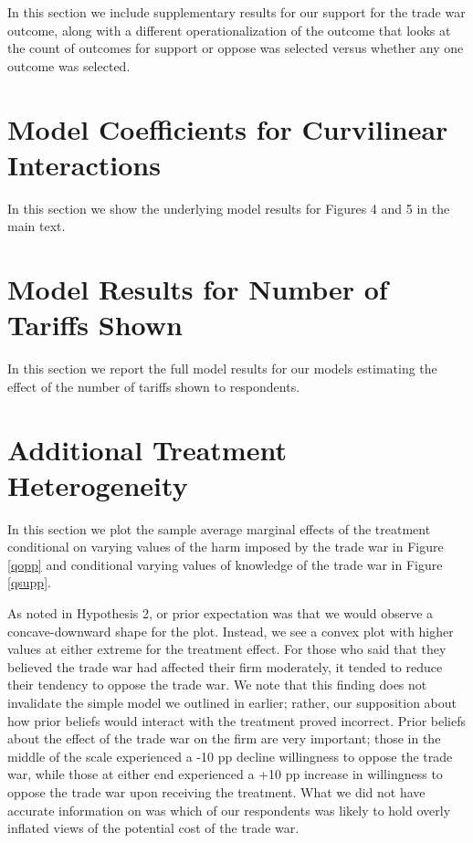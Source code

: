 In this section we include supplementary results for our support for the trade war outcome, along with a different operationalization of the outcome that looks at the count of outcomes for support or oppose was selected versus whether any one outcome was selected.





\section{Model Coefficients for Curvilinear Interactions}

In this section we show the underlying model results for Figures 4 and 5 in the main text.



\section{Model Results for Number of Tariffs Shown}

In this section we report the full model results for our models estimating the effect of the number of tariffs shown to respondents.




\section{Additional Treatment Heterogeneity}

In this section we plot the sample average marginal effects of the treatment conditional on varying values of the harm imposed by the trade war in Figure \ref{qopp} and conditional varying values of knowledge of the trade war in Figure \ref{qsupp}.

As noted in Hypothesis 2, or prior expectation was that we would observe a concave-downward shape for the plot. Instead, we see a convex plot with higher values at either extreme for the treatment effect. For those who said that they believed the trade war had affected their firm moderately, it tended to reduce their tendency to oppose the trade war. We note that this finding does not invalidate the simple model we outlined in earlier; rather, our supposition about how prior beliefs would interact with the treatment proved incorrect. Prior beliefs about the effect of the trade war on the firm are very important; those in the middle of the scale experienced a -10 pp decline willingness to oppose the trade war, while those at either end experienced a +10 pp increase in willingness to oppose the trade war upon receiving the treatment. What we did not have accurate information on was which of our respondents was likely to hold overly inflated views of the potential cost of the trade war.

